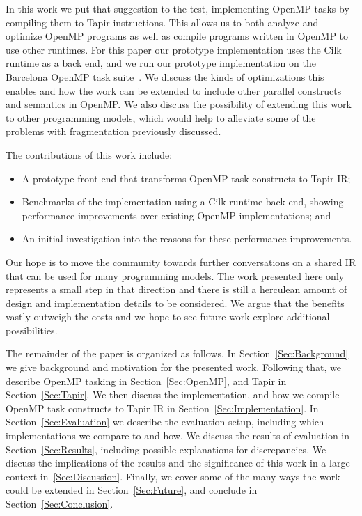 \documentclass[sigconf]{acmart}
\begin{document}
In this work we put that suggestion to the test, implementing OpenMP tasks by
compiling them to Tapir instructions. This allows us to both analyze and optimize
OpenMP programs as well as compile programs written in OpenMP to use other runtimes.
For this paper our prototype implementation uses the Cilk runtime as a back end,
and we run our prototype implementation on the Barcelona OpenMP task
suite~\cite{barcelona}.  We discuss the kinds of optimizations this enables and
how the work can be extended to include other parallel constructs and semantics
in OpenMP. We also discuss the possibility of extending this work to other
programming models, which would help to alleviate some of the problems with
fragmentation previously discussed.

The contributions of this work include:
\begin{itemize}
  \item A prototype front end that transforms OpenMP task constructs to Tapir IR;
  \item Benchmarks of the implementation using a Cilk runtime back end, showing
        performance improvements over existing OpenMP implementations; and
  \item An initial investigation into the reasons for these performance improvements.
\end{itemize}
Our hope is to move the community towards further conversations on a
shared IR that can be used for many programming models. The work presented here only
represents a small step in that direction and there is still a herculean amount
of design and implementation details to be considered. We argue that the benefits vastly outweigh
the costs and we hope to see future work explore additional possibilities.


The remainder of the paper is organized as follows.  In Section~\ref{Sec:Background}
we give background and motivation for the presented work. Following that, we describe OpenMP
tasking in Section~\ref{Sec:OpenMP}, and Tapir in Section~\ref{Sec:Tapir}. We then
discuss the implementation, and how we compile OpenMP task constructs to Tapir IR in
Section~\ref{Sec:Implementation}. In Section~\ref{Sec:Evaluation} we describe the
evaluation setup, including which implementations we compare to and how. We discuss
the results of evaluation in Section~\ref{Sec:Results}, including possible
explanations for discrepancies. We discuss the implications of the results and the
significance of this work in a large context in~\ref{Sec:Discussion}. Finally,
we cover some of the many ways the work could be extended in
Section~\ref{Sec:Future}, and conclude in Section~\ref{Sec:Conclusion}.
\end{document}
